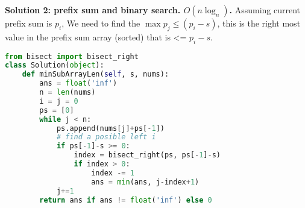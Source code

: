 \documentclass[../main.tex]{subfiles}
\begin{document}
\begin{examples}[resume]
\textbf{Solution 2: prefix sum and binary search. $O(n\log_n)$.} Assuming current prefix sum is $p_i$, We need to find the $\max p_j \leq (p_i-s)$, this is the right most value in the prefix sum array (sorted) that is <= $p_i -s$. 
\begin{lstlisting}[language=Python]
from bisect import bisect_right
class Solution(object):
    def minSubArrayLen(self, s, nums):
        ans = float('inf')
        n = len(nums)
        i = j = 0
        ps = [0]
        while j < n:
            ps.append(nums[j]+ps[-1]) 
            # find a posible left i
            if ps[-1]-s >= 0:
                index = bisect_right(ps, ps[-1]-s)
                if index > 0:
                    index -= 1
                    ans = min(ans, j-index+1)
            j+=1
        return ans if ans != float('inf') else 0
\end{lstlisting}
\end{examples}
\end{document}
